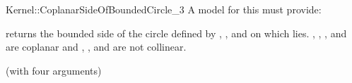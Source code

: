 \begin{ccRefFunctionObjectConcept}{Kernel::CoplanarSideOfBoundedCircle_3}
A model for this must provide:


         {returns the bounded side of the circle defined
          by , , and  on which  lies.
          \ccPrecond {}, , , and  are coplanar and
          , , and  are not collinear.}

\ccRefines
{} (with four arguments)

\ccSeeAlso
{}\\

\end{ccRefFunctionObjectConcept}

